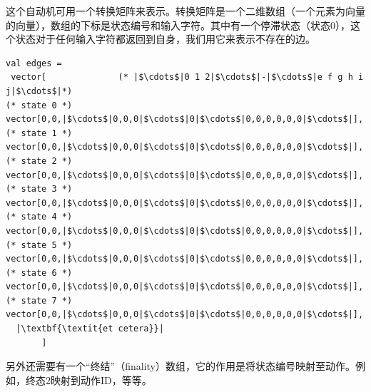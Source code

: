 \documentclass[cn,11pt,chinese]{elegantbook}
\begin{document}
这个自动机可用一个转换矩阵来表示。转换矩阵是一个二维数组（一个元素为向量的向量），数组的下标是状态编号和输入字符。其中有一个停滞状态（状态0），这个状态对于任何输入字符都返回到自身，我们用它来表示不存在的边。

\begin{verbatim}
val edges =
 vector[              (* |$\cdots$|0 1 2|$\cdots$|-|$\cdots$|e f g h i j|$\cdots$|*)
(* state 0 *) vector[0,0,|$\cdots$|0,0,0|$\cdots$|0|$\cdots$|0,0,0,0,0,0|$\cdots$|],
(* state 1 *) vector[0,0,|$\cdots$|0,0,0|$\cdots$|0|$\cdots$|0,0,0,0,0,0|$\cdots$|],
(* state 2 *) vector[0,0,|$\cdots$|0,0,0|$\cdots$|0|$\cdots$|0,0,0,0,0,0|$\cdots$|],
(* state 3 *) vector[0,0,|$\cdots$|0,0,0|$\cdots$|0|$\cdots$|0,0,0,0,0,0|$\cdots$|],
(* state 4 *) vector[0,0,|$\cdots$|0,0,0|$\cdots$|0|$\cdots$|0,0,0,0,0,0|$\cdots$|],
(* state 5 *) vector[0,0,|$\cdots$|0,0,0|$\cdots$|0|$\cdots$|0,0,0,0,0,0|$\cdots$|],
(* state 6 *) vector[0,0,|$\cdots$|0,0,0|$\cdots$|0|$\cdots$|0,0,0,0,0,0|$\cdots$|],
(* state 7 *) vector[0,0,|$\cdots$|0,0,0|$\cdots$|0|$\cdots$|0,0,0,0,0,0|$\cdots$|],
  |\textbf{\textit{et cetera}}|
       ]   
\end{verbatim}

另外还需要有一个“终结”（finality）数组，它的作用是将状态编号映射至动作。例如，终态2映射到动作ID，等等。
\end{document}
